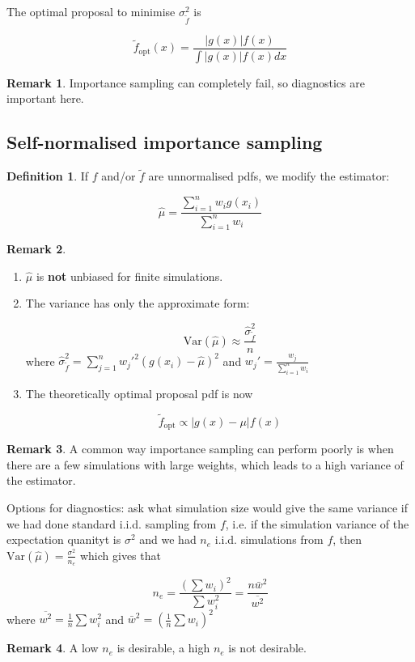 \documentclass[12pt,a4paper]{article}
\theoremstyle{definition}
\newtheorem{definition}{Definition}[subsection]
\newtheorem*{remark}{Remark}
\begin{document}
The optimal proposal to minimise $\sigma_{\tilde{f}}^2$ is

\[ \tilde{f}_{\text{opt}} (x) = \frac{|g(x)| f(x)}{\int |g(x)| f(x) dx} \]

\begin{remark}
	Importance sampling can completely fail, so diagnostics are important here.
\end{remark}

\subsection{Self-normalised importance sampling}

\begin{definition}
	If $f$ and/or $\tilde{f}$ are unnormalised pdfs, we modify the estimator:

	\[ \hat{\mu} = \frac{\sum_{i = 1}^n w_i g(x_i)}{\sum_{i = 1}^n w_i} \]
\end{definition}

\begin{remark}
	\hfill
	\begin{enumerate}
		\item $\hat{\mu}$ is \textbf{not} unbiased for finite simulations.
		\item The variance has only the approximate form:
		
		\[ \text{Var}(\hat{\mu}) \approx \frac{\hat{\sigma}_{\tilde{f}}^2}{n} \]
		where $\hat{\sigma}_{\tilde{f}}^2 = \sum_{j = 1}^n w_j'^2 (g(x_i) - \hat{\mu})^2$ and $w_j' = \frac{w_j}{\sum_{i = 1}^n w_i}$
		\item The theoretically optimal proposal pdf is now
		
		\[ \tilde{f}_{\text{opt}} \propto |g(x) - \mu| f(x) \]
	\end{enumerate}
\end{remark}

\begin{remark}
	A common way importance sampling can perform poorly is when there are a few simulations with large weights, which leads to a high variance of the estimator.
	
	Options for diagnostics: ask what simulation size would give the same variance if we had done standard i.i.d. sampling from $f$, i.e. if the simulation variance of the expectation quanityt is $\sigma^2$ and we had $n_e$ i.i.d. simulations from $f$, then $\text{Var}(\hat{\mu}) = \frac{\sigma^2}{n_e}$ which gives that

	\[ n_e = \frac{{\left(\sum w_i \right)}^2}{\sum w_i^2} = \frac{n \bar{w}^2}{\overline{w^2}} \]
	where $\overline{w^2} = \frac{1}{n} \sum w_i^2$ and $\bar{w}^2 = {\left(\frac{1}{n} \sum w_i\right)}^2$
\end{remark}

\begin{remark}
	A low $n_e$ is desirable, a high $n_e$ is not desirable.
\end{remark}
\end{document}
